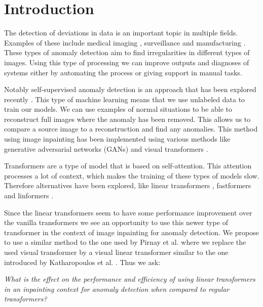 \chapter{Introduction}\label{ch:introduction}

The detection of deviations in data is an important topic in multiple fields. Examples of these include medical imaging \cite{han_madgan_2021}, surveillance \cite{shashikar_traffic_2017} and manufacturing \cite{susto_anomaly_2017}. These types of anomaly detection aim to find irregularities in different types of images. Using this type of processing we can improve outputs and diagnoses of systems either by automating the process or giving support in manual tasks.

Notably self-supervised anomaly detection is an approach that has been explored recently \cite{li_cutpaste_2021, ali_self-supervised_2020}. This type of machine learning means that we use unlabeled data to train our models. We can use examples of normal situations to be able to reconstruct full images where the anomaly has been removed. This allows us to compare a source image to a reconstruction and find any anomalies. This method using image inpainting has been implemented using various methods like generative adversarial networks (GANs) \cite{yeh_semantic_2017} and visual transformers \cite{pirnay_inpainting_2021}.

Transformers \cite{vaswani_attention_2017} are a type of model that is based on self-attention. This attention processes a lot of context, which makes the training of these types of models slow. Therefore alternatives have been explored, like linear transformers \cite{katharopoulos_transformers_2020}, fastformers \cite{wu_fastformer_2021} and linformers \cite{wang_linformer_2020}.

Since the linear transformers seem to have some performance improvement over the vanilla transformers we see an opportunity to use this newer type of transformer in the context of image inpainting for anomaly detection. We propose to use a similar method to the one used by Pirnay et al. \cite{pirnay_inpainting_2021} where we replace the used visual transformer by a visual linear transformer similar to the one introduced by Katharopoulos et al. \cite{katharopoulos_transformers_2020}. Thus we ask:

\textsl{What is the effect on the performance and efficiency of using linear transformers in an inpainting context for anomaly detection when compared to regular transformers?}

